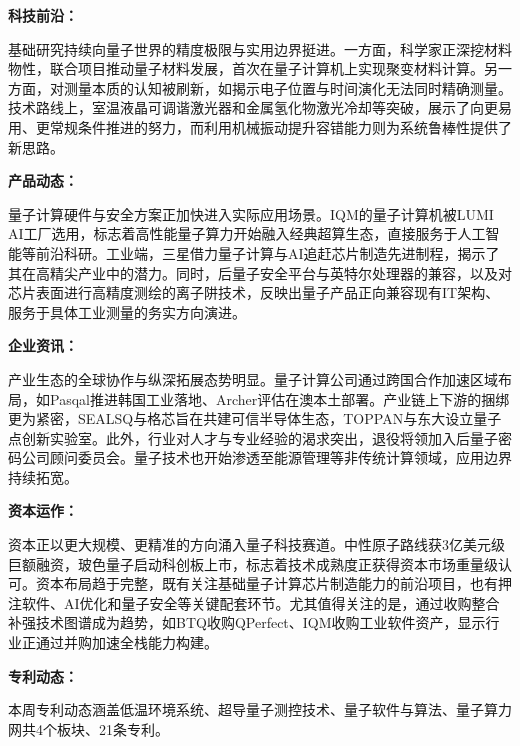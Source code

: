 \documentclass[12pt,a4paper]{ctexart}
\begin{document}
\textbf{ 科技前沿：}

基础研究持续向量子世界的精度极限与实用边界挺进。一方面，科学家正深挖材料物性，联合项目推动量子材料发展，首次在量子计算机上实现聚变材料计算。另一方面，对测量本质的认知被刷新，如揭示电子位置与时间演化无法同时精确测量。技术路线上，室温液晶可调谐激光器和金属氢化物激光冷却等突破，展示了向更易用、更常规条件推进的努力，而利用机械振动提升容错能力则为系统鲁棒性提供了新思路。


\textbf{ 产品动态：}

量子计算硬件与安全方案正加快进入实际应用场景。IQM的量子计算机被LUMI AI工厂选用，标志着高性能量子算力开始融入经典超算生态，直接服务于人工智能等前沿科研。工业端，三星借力量子计算与AI追赶芯片制造先进制程，揭示了其在高精尖产业中的潜力。同时，后量子安全平台与英特尔处理器的兼容，以及对芯片表面进行高精度测绘的离子阱技术，反映出量子产品正向兼容现有IT架构、服务于具体工业测量的务实方向演进。


\textbf{ 企业资讯：}

产业生态的全球协作与纵深拓展态势明显。量子计算公司通过跨国合作加速区域布局，如Pasqal推进韩国工业落地、Archer评估在澳本土部署。产业链上下游的捆绑更为紧密，SEALSQ与格芯旨在共建可信半导体生态，TOPPAN与东大设立量子点创新实验室。此外，行业对人才与专业经验的渴求突出，退役将领加入后量子密码公司顾问委员会。量子技术也开始渗透至能源管理等非传统计算领域，应用边界持续拓宽。


\textbf{ 资本运作：}

资本正以更大规模、更精准的方向涌入量子科技赛道。中性原子路线获3亿美元级巨额融资，玻色量子启动科创板上市，标志着技术成熟度正获得资本市场重量级认可。资本布局趋于完整，既有关注基础量子计算芯片制造能力的前沿项目，也有押注软件、AI优化和量子安全等关键配套环节。尤其值得关注的是，通过收购整合补强技术图谱成为趋势，如BTQ收购QPerfect、IQM收购工业软件资产，显示行业正通过并购加速全栈能力构建。




\textbf{ 专利动态：}

本周专利动态涵盖低温环境系统、超导量子测控技术、量子软件与算法、量子算力网共4个板块、21条专利。
\end{document}
